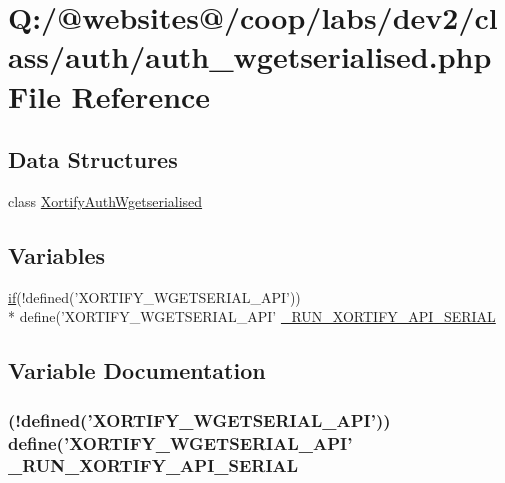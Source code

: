\hypertarget{auth__wgetserialised_8php}{\section{Q\-:/@websites@/coop/labs/dev2/class/auth/auth\-\_\-wgetserialised.php File Reference}
\label{auth__wgetserialised_8php}
}
\subsection*{Data Structures}
\begin{DoxyCompactItemize}
\item 
class \hyperlink{class_xortify_auth_wgetserialised}{Xortify\-Auth\-Wgetserialised}
\end{DoxyCompactItemize}
\subsection*{Variables}
\begin{DoxyCompactItemize}
\item 
\hyperlink{index_8php_ae2ccdf355624402b65fc2226f2a661cd}{if}(!defined('X\-O\-R\-T\-I\-F\-Y\-\_\-\-W\-G\-E\-T\-S\-E\-R\-I\-A\-L\-\_\-\-A\-P\-I')) \\*
define('X\-O\-R\-T\-I\-F\-Y\-\_\-\-W\-G\-E\-T\-S\-E\-R\-I\-A\-L\-\_\-\-A\-P\-I' \hyperlink{auth__wgetserialised_8php_a4257134ff60de1715d93d755acc4a14b}{\-\_\-\-R\-U\-N\-\_\-\-X\-O\-R\-T\-I\-F\-Y\-\_\-\-A\-P\-I\-\_\-\-S\-E\-R\-I\-A\-L}
\end{DoxyCompactItemize}


\subsection{Variable Documentation}
\hypertarget{auth__wgetserialised_8php_a4257134ff60de1715d93d755acc4a14b}{
\subsubsection[{\-\_\-\-R\-U\-N\-\_\-\-X\-O\-R\-T\-I\-F\-Y\-\_\-\-A\-P\-I\-\_\-\-S\-E\-R\-I\-A\-L}]{ (!defined('X\-O\-R\-T\-I\-F\-Y\-\_\-\-W\-G\-E\-T\-S\-E\-R\-I\-A\-L\-\_\-\-A\-P\-I')) define('X\-O\-R\-T\-I\-F\-Y\-\_\-\-W\-G\-E\-T\-S\-E\-R\-I\-A\-L\-\_\-\-A\-P\-I' \-\_\-\-R\-U\-N\-\_\-\-X\-O\-R\-T\-I\-F\-Y\-\_\-\-A\-P\-I\-\_\-\-S\-E\-R\-I\-A\-L}}\label{auth__wgetserialised_8php_a4257134ff60de1715d93d755acc4a14b}
